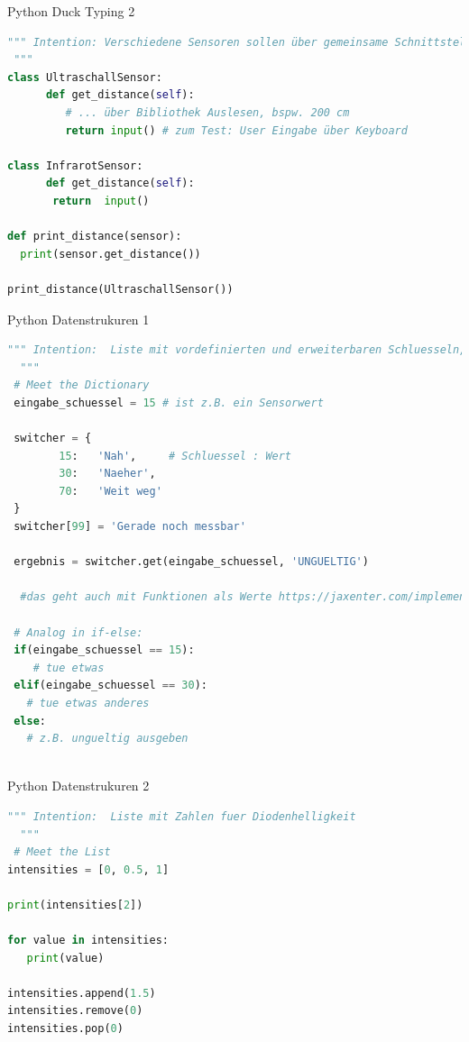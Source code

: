 \begin{frame}[fragile]{Python Duck Typing 2}
\begin{lstlisting}[language=Python]
 """ Intention: Verschiedene Sensoren sollen über gemeinsame Schnittstelle die Distanz zurückliefern
 """
class UltraschallSensor:
	  def get_distance(self):
	     # ... über Bibliothek Auslesen, bspw. 200 cm
	     return input() # zum Test: User Eingabe über Keyboard
             
class InfrarotSensor:
	  def get_distance(self):
	   return  input()

def print_distance(sensor):
  print(sensor.get_distance())

print_distance(UltraschallSensor())

\end{lstlisting}
\end{frame}


\begin{frame}[fragile]{Python Datenstrukuren 1}
\begin{lstlisting}[language=Python]
 """ Intention:  Liste mit vordefinierten und erweiterbaren Schluesseln, Format aehnlich zu Java Script Object Literals
  """
 # Meet the Dictionary
 eingabe_schuessel = 15 # ist z.B. ein Sensorwert
 
 switcher = {
        15:   'Nah',     # Schluessel : Wert
        30:   'Naeher',
        70:   'Weit weg'
 }
 switcher[99] = 'Gerade noch messbar'
 
 ergebnis = switcher.get(eingabe_schuessel, 'UNGUELTIG')
 
  #das geht auch mit Funktionen als Werte https://jaxenter.com/implement-switch-case-statement-python-138315.html
 
 # Analog in if-else:
 if(eingabe_schuessel == 15):
    # tue etwas
 elif(eingabe_schuessel == 30):
   # tue etwas anderes
 else:
   # z.B. ungueltig ausgeben
 

\end{lstlisting}
\end{frame}

\begin{frame}[fragile]{Python Datenstrukuren 2}
\begin{lstlisting}[language=Python]
 """ Intention:  Liste mit Zahlen fuer Diodenhelligkeit
  """
 # Meet the List
intensities = [0, 0.5, 1]

print(intensities[2])

for value in intensities:
   print(value)
   
intensities.append(1.5)
intensities.remove(0)
intensities.pop(0)

   
\end{lstlisting}
\end{frame}


